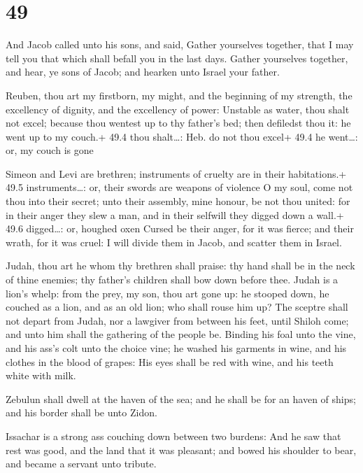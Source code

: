 \hypertarget{section-48}{%
\section{49}\label{section-48}}

 And Jacob called unto his sons, and said, Gather yourselves
together, that I may tell you that which shall befall you in the last
days.  Gather yourselves together, and hear, ye sons of
Jacob; and hearken unto Israel your father.

 Reuben, thou art my firstborn, my might, and the
beginning of my strength, the excellency of dignity, and the excellency
of power:  Unstable as water, thou shalt not excel; because
thou wentest up to thy father's bed; then defiledst thou it: he went up
to my couch.+ 49.4 thou shalt\ldots: Heb. do not thou excel+ 49.4 he
went\ldots: or, my couch is gone

 Simeon and Levi are brethren; instruments of cruelty are
in their habitations.+ 49.5 instruments\ldots: or, their swords are
weapons of violence  O my soul, come not thou into their
secret; unto their assembly, mine honour, be not thou united: for in
their anger they slew a man, and in their selfwill they digged down a
wall.+ 49.6 digged\ldots: or, houghed oxen  Cursed be their
anger, for it was fierce; and their wrath, for it was cruel: I will
divide them in Jacob, and scatter them in Israel.

 Judah, thou art he whom thy brethren shall praise: thy
hand shall be in the neck of thine enemies; thy father's children shall
bow down before thee.  Judah is a lion's whelp: from the
prey, my son, thou art gone up: he stooped down, he couched as a lion,
and as an old lion; who shall rouse him up?  The sceptre
shall not depart from Judah, nor a lawgiver from between his feet, until
Shiloh come; and unto him shall the gathering of the people be.
 Binding his foal unto the vine, and his ass's colt unto
the choice vine; he washed his garments in wine, and his clothes in the
blood of grapes:  His eyes shall be red with wine, and his
teeth white with milk.

 Zebulun shall dwell at the haven of the sea; and he
shall be for an haven of ships; and his border shall be unto Zidon.

 Issachar is a strong ass couching down between two
burdens:  And he saw that rest was good, and the land that
it was pleasant; and bowed his shoulder to bear, and became a servant
unto tribute.

